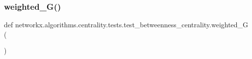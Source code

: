 \subsubsection{\texorpdfstring{weighted\+\_\+\+G()}{weighted\_G()}}
{\footnotesize\ttfamily def networkx.\+algorithms.\+centrality.\+tests.\+test\+\_\+betweenness\+\_\+centrality.\+weighted\+\_\+G (\begin{DoxyParamCaption}{ }\end{DoxyParamCaption})}

